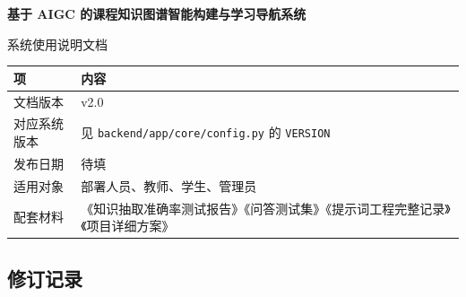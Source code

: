 \documentclass[UTF8,a4paper,11pt]{ctexrep}
\begin{document}
\begin{center}
{\Huge\bfseries 基于 AIGC 的课程知识图谱智能构建与学习导航系统\par}
\end{center}


\begin{center}
{\LARGE 系统使用说明文档\par}
\end{center}
\vspace{1em}

\begin{center}
\small
\begin{tabularx}{\linewidth}{@{}XX@{}}
\toprule
项 & 内容 \\
\midrule
文档版本 & v2.0 \\
对应系统版本 & 见 \texttt{backend/app/core/config.py} 的 \texttt{VERSION} \\
发布日期 & 待填 \\
适用对象 & 部署人员、教师、学生、管理员 \\
配套材料 & 《知识抽取准确率测试报告》《问答测试集》《提示词工程完整记录》《项目详细方案》 \\
\bottomrule
\end{tabularx}
\end{center}

\subsection*{修订记录}
\end{document}
